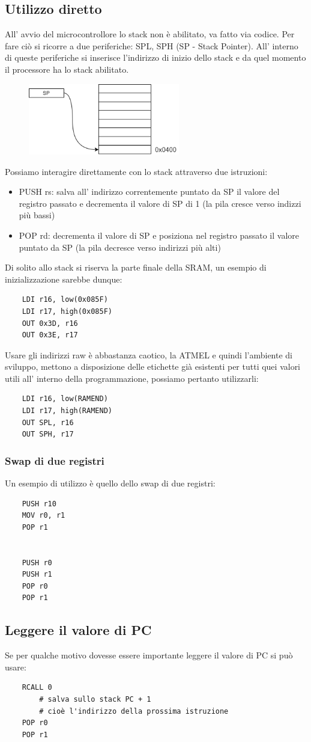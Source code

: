 \subsection{Utilizzo diretto}
All' avvio del microcontrollore lo stack non è abilitato, va fatto via codice.
Per fare ciò si ricorre a due periferiche: SPL, SPH (SP - Stack Pointer).
All' interno di queste periferiche si inserisce l'indirizzo di inizio dello stack e da quel momento il processore ha lo stack abilitato.

\begin{figure}[H]
    \centering
    \includegraphics[width=250px]{images/9_Stack/SP.png}
\end{figure}

Possiamo interagire direttamente con lo stack attraverso due istruzioni:
\begin{itemize}
    \item PUSH rs: salva all' indirizzo correntemente puntato da SP il valore del registro passato e decrementa il valore di SP di 1 (la pila cresce verso indizzi più bassi)
    \item POP rd: decrementa il valore di SP e posiziona nel registro passato il valore puntato da SP
    (la pila decresce verso indirizzi più alti)
\end{itemize}

Di solito allo stack si riserva la parte finale della SRAM, un esempio di inizializzazione sarebbe dunque:
\begin{verbatim}
    LDI r16, low(0x085F)
    LDI r17, high(0x085F)
    OUT 0x3D, r16
    OUT 0x3E, r17
\end{verbatim}

Usare gli indirizzi raw è abbastanza caotico, la ATMEL e quindi l'ambiente di sviluppo, mettono a disposizione delle etichette già esistenti per tutti quei valori utili all' interno della programmazione, possiamo pertanto utilizzarli:
\begin{verbatim}
    LDI r16, low(RAMEND)
    LDI r17, high(RAMEND)
    OUT SPL, r16
    OUT SPH, r17
\end{verbatim}

\subsubsection{Swap di due registri}
Un esempio di utilizzo è quello dello swap di due registri:
\begin{verbatim}
    PUSH r10
    MOV r0, r1
    POP r1
    
    
    PUSH r0
    PUSH r1
    POP r0
    POP r1
\end{verbatim}

\subsection{Leggere il valore di PC}
Se per qualche motivo dovesse essere importante leggere il valore di PC si può usare:
\begin{verbatim}
    RCALL 0
        # salva sullo stack PC + 1
        # cioè l'indirizzo della prossima istruzione
    POP r0
    POP r1
\end{verbatim}




